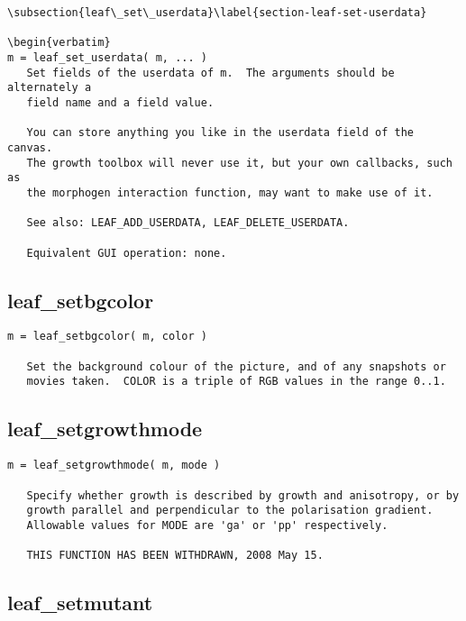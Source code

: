 \begin{verbatim}
\subsection{leaf\_set\_userdata}\label{section-leaf-set-userdata}

\begin{verbatim}
m = leaf_set_userdata( m, ... )
   Set fields of the userdata of m.  The arguments should be alternately a
   field name and a field value.

   You can store anything you like in the userdata field of the canvas.
   The growth toolbox will never use it, but your own callbacks, such as
   the morphogen interaction function, may want to make use of it.

   See also: LEAF_ADD_USERDATA, LEAF_DELETE_USERDATA.

   Equivalent GUI operation: none.
\end{verbatim}

\subsection{leaf\_setbgcolor}\label{section-leaf-setbgcolor}

\begin{verbatim}
m = leaf_setbgcolor( m, color )

   Set the background colour of the picture, and of any snapshots or
   movies taken.  COLOR is a triple of RGB values in the range 0..1.
\end{verbatim}

\subsection{leaf\_setgrowthmode}\label{section-leaf-setgrowthmode}

\begin{verbatim}
m = leaf_setgrowthmode( m, mode )

   Specify whether growth is described by growth and anisotropy, or by
   growth parallel and perpendicular to the polarisation gradient.
   Allowable values for MODE are 'ga' or 'pp' respectively.

   THIS FUNCTION HAS BEEN WITHDRAWN, 2008 May 15.
\end{verbatim}

\subsection{leaf\_setmutant}\label{section-leaf-setmutant}

